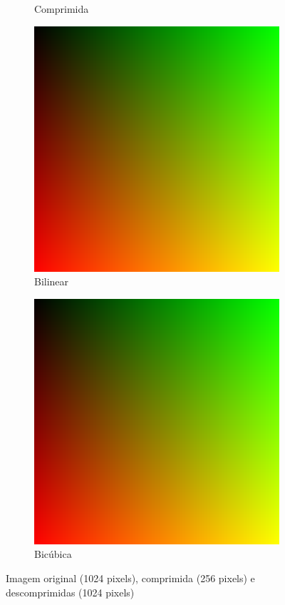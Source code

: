 \documentclass{article}
\begin{document}
\begin{figure}[ht]
\begin{subfigure}{0.23\textwidth}
    \caption{Comprimida}
  \end{subfigure}%
  \hfill
  \begin{subfigure}{0.23\textwidth}
    \centering
    \includegraphics[width=\textwidth]{gradiente/decompressed-bilinear.png}
    \caption{Bilinear}
  \end{subfigure}%
  \hfill
  \begin{subfigure}{0.23\textwidth}
    \centering
    \includegraphics[width=\textwidth]{gradiente/decompressed-bicubica.png}
    \caption{Bicúbica}
  \end{subfigure}
  \caption{Imagem original (1024 pixels), comprimida (256 pixels) e descomprimidas (1024 pixels)}
\end{figure}
\end{document}
